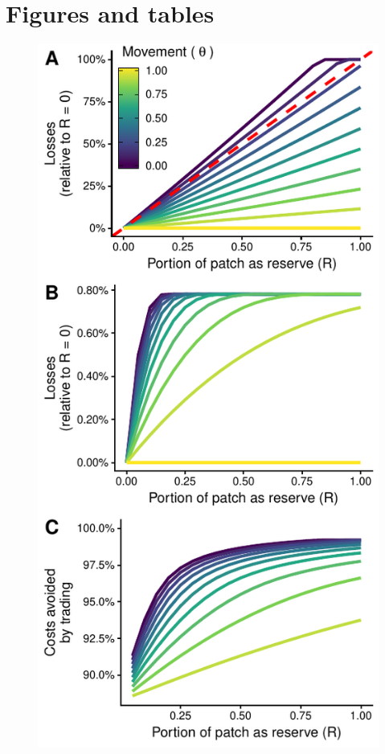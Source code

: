 \documentclass[12pt]{article}
\begin{document}




\clearpage

\FloatBarrier

\section*{Figures and tables}

\begin{figure}[htbp]
\centering
\includegraphics{img/PNA_model.pdf}

\end{figure}
\end{document}
